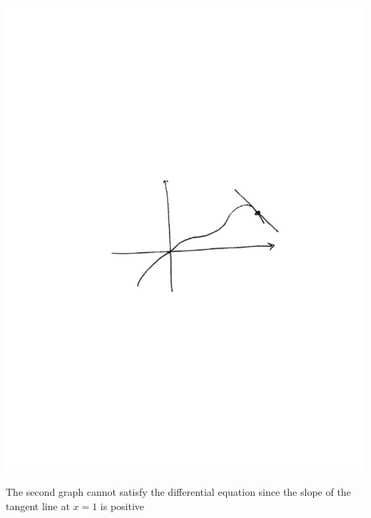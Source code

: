\documentclass[]{ximera}
\begin{document}
\begin{problem}
\begin{freeResponse}
	\begin{image}
	\includegraphics[trim= 170 300 190 310, scale=1]{Figure8-1-2.pdf}	
	\end{image}
	
	The second graph cannot satisfy the differential equation since the slope of the tangent line at $x=1$ is positive
	

\end{freeResponse}
\end{problem}
\end{document}
